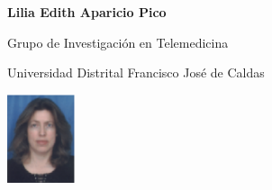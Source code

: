 \begin{figure}[!htpb]
\begin{minipage}[r]{0.8\textwidth}
\begin{flushright}
\textbf{Lilia Edith Aparicio Pico}

Grupo de Investigación en Telemedicina

Universidad Distrital Francisco José de Caldas
\end{flushright}
\end{minipage}
\begin{minipage}[r]{0.15\textwidth}
 \includegraphics[width=20mm, height=26mm]{edith.png}
\end{minipage}
\end{figure}